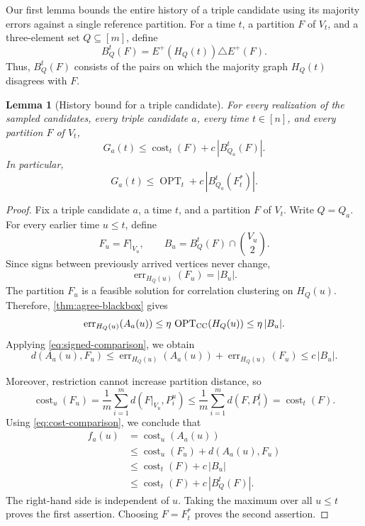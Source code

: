 \documentclass[11pt]{article}
\newtheorem{lemma}[theorem]{Lemma}
\theoremstyle{definition}
\theoremstyle{remark}
\newcommand{\OPT}{\operatorname{OPT}}
\newcommand{\cost}{\operatorname{cost}}
\newcommand{\err}{\operatorname{err}}
\newcommand{\1}{\mathbf{1}}
\begin{document}
Our first lemma bounds the entire history of a triple candidate
using its majority errors against a single reference partition.
For a time $t$, a partition $F$ of $V_t$, and a three-element set
$Q\subseteq[m]$, define
\[
    B_Q^t(F)
    =
    E^+(H_Q(t))\triangle E^+(F).
\]
Thus, $B_Q^t(F)$ consists of the pairs on which the majority graph
$H_Q(t)$ disagrees with $F$.

\begin{lemma}[History bound for a triple candidate]
\label{lem:oncon-history}
For every realization of the sampled candidates, every triple
candidate $a$, every time $t\in[n]$, and every partition $F$ of $V_t$,
\[
    G_a(t)
    \leq
    \cost_t(F)+c\,|B_{Q_a}^t(F)|.
\]
In particular,
\[
    G_a(t)
    \leq
    \OPT_t+c\,|B_{Q_a}^t(F_t^*)|.
\]
\end{lemma}

\begin{proof}
Fix a triple candidate $a$, a time $t$, and a partition $F$ of $V_t$.
Write $Q=Q_a$. For every earlier time $u\leq t$, define
\[
    F_u=F|_{V_u},
    \qquad
    B_u=B_Q^t(F)\cap\binom{V_u}{2}.
\]
Since signs between previously arrived vertices never change,
\[
    \err_{H_Q(u)}(F_u)=|B_u|.
\]
The partition $F_u$ is a feasible solution for correlation clustering
on $H_Q(u)$. Therefore, \cref{thm:agree-blackbox} gives
\[
    \err_{H_Q(u)}(A_a(u))
    \leq
    \eta\,\OPT_{\rm CC}(H_Q(u))
    \leq
    \eta\,|B_u|.
\]
Applying \eqref{eq:signed-comparison}, we obtain
\begin{equation}\label{eq:oncon-history-distance}
    d(A_a(u),F_u)
    \leq
    \err_{H_Q(u)}(A_a(u))
    +
    \err_{H_Q(u)}(F_u)
    \leq
    c\,|B_u|.
\end{equation}

Moreover, restriction cannot increase partition distance, so
\[
    \cost_u(F_u)
    =
    \frac1m\sum_{i=1}^m d(F|_{V_u},P_i^u)
    \leq
    \frac1m\sum_{i=1}^m d(F,P_i^t)
    =
    \cost_t(F).
\]
Using \eqref{eq:cost-comparison}, we conclude that
\begin{align*}
    f_a(u)
    &=
    \cost_u(A_a(u))\\
    &\leq
    \cost_u(F_u)+d(A_a(u),F_u)\\
    &\leq
    \cost_t(F)+c\,|B_u|\\
    &\leq
    \cost_t(F)+c\,|B_Q^t(F)|.
\end{align*}
The right-hand side is independent of $u$. Taking the maximum over
all $u\leq t$ proves the first assertion. Choosing $F=F_t^*$ proves
the second assertion.
\end{proof}
\end{document}
